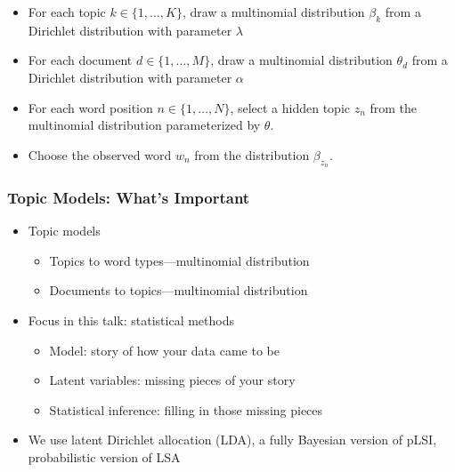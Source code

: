 {\begin{itemize}
\item<1-> For each topic $k \in \{1, \dots, K\}$, draw a multinomial distribution $\beta_k$ from a Dirichlet distribution with parameter $\lambda$
\item<2-> For each document $d \in \{1, \dots, M\}$, draw a multinomial distribution $\theta_d$ from a Dirichlet distribution with parameter $\alpha$
\item<3-> For each word position $n \in \{1, \dots, N\}$, select a hidden topic $z_n$ from the multinomial distribution parameterized by $\theta$.
\item<4-> Choose the observed word $w_n$ from the distribution $\beta_{z_n}$.
\end{itemize}

}

\begin{frame}
\frametitle{Topic Models: What's Important}
\begin{itemize}
\item Topic models 
\begin{itemize}
	\item Topics to word types---multinomial distribution
	\item Documents to topics---multinomial distribution
\end{itemize}
\item Focus in this talk: statistical methods
  \begin{itemize}
    \item Model: story of how your data came to be
    \item Latent variables: missing pieces of your story
    \item Statistical inference: filling in those missing pieces
  \end{itemize}
\item We use latent Dirichlet allocation (LDA), a fully Bayesian
  version of pLSI, probabilistic version of
  LSA
\end{itemize}

\end{frame}
